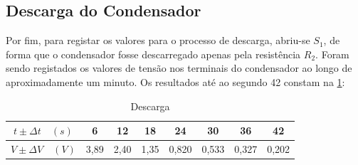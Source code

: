 \subsection{Descarga do Condensador}
Por fim, para registar os valores para o processo de descarga, abriu-se $S_1$, de forma que o condensador fosse descarregado apenas pela resistência $R_2$. Foram sendo registados os valores de tensão nos terminais do condensador ao longo de aproximadamente um minuto. Os resultados até ao segundo 42 constam na \cref{tab:descarga}:

\begin{table}[!ht]
	\centering
	\begin{tabular}{|c|c|c|c|c|c|c|c|}
		\hline
		$t \pm \Delta t \quad (\unit{s})$ & 6    & 12   & 18   & 24    & 30    & 36    & 42    \\
		\hline
		$V \pm \Delta V \quad (\unit{V})$ & 3,89 & 2,40 & 1,35 & 0,820 & 0,533 & 0,327 & 0,202 \\
		\hline
	\end{tabular}
	\caption{Descarga}
	\label{tab:descarga}
\end{table}


